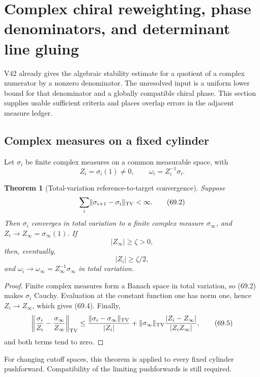 \documentclass[11pt]{article}
\newtheorem{theorem}{Theorem}[section]
\begin{document}
\section{Complex chiral reweighting, phase denominators, and determinant
line gluing}
\label{sec:v11v69}

V42 already gives the algebraic stability estimate for a quotient of
a complex numerator by a nonzero denominator.  The unresolved input is
a uniform lower bound for that denominator and a globally compatible
chiral phase.  This section supplies usable sufficient criteria and
places overlap errors in the adjacent measure ledger.

\subsection{Complex measures on a fixed cylinder}

Let \(\sigma_i\) be finite complex measures on a common measurable
space, with
\[
                         Z_i=\sigma_i(1)\ne0,\qquad
                         \omega_i=Z_i^{-1}\sigma_i.            \tag{69.1}
\]

\begin{theorem}[Total-variation reference-to-target convergence]
\label{thm:v11v69-tv}
Suppose
\[
                         \sum_i\lVert\sigma_{i+1}-\sigma_i
                                      \rVert_{\rm TV}<\infty. \tag{69.2}
\]
Then \(\sigma_i\) converges in total variation to a finite complex
measure \(\sigma_\infty\), and \(Z_i\to Z_\infty=\sigma_\infty(1)\).
If
\[
                              |Z_\infty|\ge\zeta>0,            \tag{69.3}
\]
then, eventually,
\[
                              |Z_i|\ge\zeta/2,                 \tag{69.4}
\]
and \(\omega_i\to\omega_\infty=Z_\infty^{-1}\sigma_\infty\) in total
variation.
\end{theorem}

\begin{proof}
Finite complex measures form a Banach space in total variation, so
(69.2) makes \(\sigma_i\) Cauchy.  Evaluation at the constant function
one has norm one, hence \(Z_i\to Z_\infty\), which gives (69.4).
Finally,
\[
 \left\|\frac{\sigma_i}{Z_i}
          -\frac{\sigma_\infty}{Z_\infty}\right\|_{\rm TV}
 \le\frac{\lVert\sigma_i-\sigma_\infty\rVert_{\rm TV}}{|Z_i|}
 +\lVert\sigma_\infty\rVert_{\rm TV}
       \frac{|Z_i-Z_\infty|}{|Z_iZ_\infty|},                 \tag{69.5}
\]
and both terms tend to zero.
\end{proof}

For changing cutoff spaces, this theorem is applied to every fixed
cylinder pushforward.  Compatibility of the limiting pushforwards is
still required.
\end{document}
